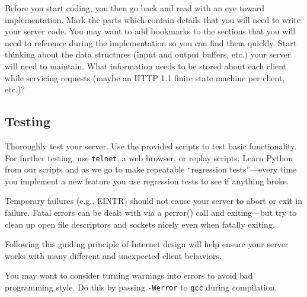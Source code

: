 	 Before you start coding, you then go back and read with an eye toward implementation. Mark the
      parts which contain details that you will need to write your server code.
      You may want to add bookmarks to the sections that you will need to reference during the
      implementation so you can find them quickly.
      Start thinking about the data structures (input and output buffers, etc.)
      your server will need to maintain. What information needs to be stored
      about each client while servicing requests (maybe an HTTP 1.1 finite state
      machine per client, etc.)?

\subsection{Testing}
	Thoroughly test your server. Use the provided scripts to test basic
	  functionality. For further testing, use \texttt{telnet}, a web browser,
	  or replay scripts. Learn Python from our scripts and as we go to make
	  repeatable ``regression tests''---every time you implement a new feature
	  you use regression tests to see if anything broke.

    \vspace{5pt}
    Temporary failures (e.g., EINTR) should not cause
      your server to abort or exit in failure.  Fatal errors can be dealt with
      via a perror() call and exiting---but try to clean up open file descriptors
      and sockets nicely even when fatally exiting.

    \vspace{5pt}
     Following this guiding principle of Internet design
      will help ensure your server works with many different and unexpected
      client behaviors.

    \vspace{5pt}
    
     You may want to consider turning warnings into errors to avoid bad
	  programming style. Do this by passing \texttt{-Werror} to \texttt{gcc}
	  during compilation.


